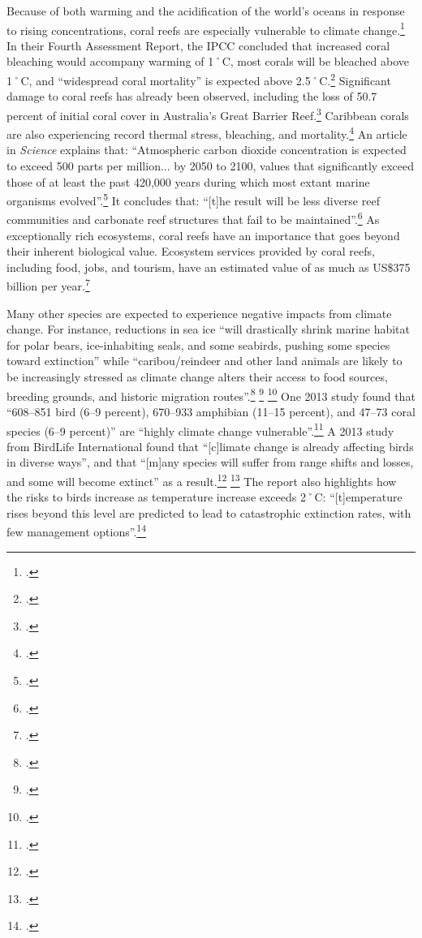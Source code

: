 \documentclass[10pt]{article}
\begin{document}
Because of both warming and the acidification of the world's oceans in response to rising  concentrations, coral reefs are especially vulnerable to climate change.\footcite[][]{CoralReefs2013}
In their Fourth Assessment Report, the IPCC concluded that increased coral bleaching would accompany warming of 1˚C, most corals will be bleached above 1˚C, and ``widespread coral mortality'' is expected above 2.5˚C.\footcite[][p.51]{IPCCar4_syr}
Significant damage to coral reefs has already been observed, including the loss of 50.7 percent of initial coral cover in Australia's Great Barrier Reef.\footcite[][]{27declinecoral}
Caribbean corals are also experiencing record thermal stress, bleaching, and mortality.\footcite[][]{CaribbeanCorals}
An article in \emph{Science} explains that: ``Atmospheric carbon dioxide concentration is expected to exceed 500 parts per million... by 2050 to 2100, values that significantly exceed those of at least the past 420,000 years during which most extant marine organisms evolved''.\footcite[][p. 1737--1742]{CoralRapidCC}
It concludes that: ``[t]he result will be less diverse reef communities and carbonate reef structures that fail to be maintained''.\footcite[][p. 1737--1742]{CoralRapidCC}
As exceptionally rich ecosystems, coral reefs have an importance that goes beyond their inherent biological value.
Ecosystem services provided by coral reefs, including food, jobs, and tourism, have an estimated value of as much as US\$375 billion per year.\footcite[][]{NOAACoral}



Many other species are expected to experience negative impacts from climate change.
For instance, reductions in sea ice ``will drastically shrink marine habitat for polar bears, ice-inhabiting seals, and some seabirds, pushing some species toward extinction'' while ``caribou/reindeer and other land animals are likely to be increasingly stressed as climate change alters their access to food sources, breeding grounds, and historic migration routes''.\footcite[][Executive summary, p. 10]{ACIA2004} \footcite[See also: ][]{Post2013} \footcite[][]{Weber2013}
One 2013 study found that ``608–851 bird (6–9 percent), 670–933 amphibian (11–15 percent), and 47–73 coral species (6–9 percent)'' are ``highly climate change vulnerable''.\footcite[][p. 1]{VulnerableSpecies}
A 2013 study from BirdLife International found that ``[c]limate change is already affecting birds in diverse ways'', and that ``[m]any species will suffer from range shifts and losses, and some will become extinct'' as a result.\footcite[][p. 15]{StateWorldBirds} \footcite[See also: ][]{CBCBirdLife}
The report also highlights how the risks to birds increase as temperature increase exceeds 2˚C: ``[t]emperature rises beyond this level are predicted to lead to catastrophic extinction rates, with few management options''.\footcite[][]{BirdLifeCC}
\end{document}

